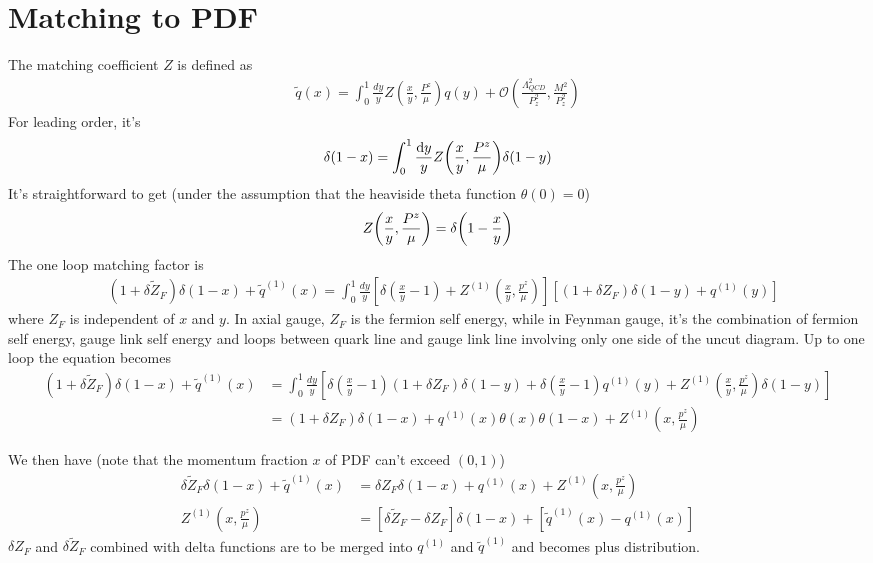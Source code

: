 \documentclass{article}
\begin{document}
\clearpage
\section{Matching to PDF}
The matching coefficient $Z$ is defined as
\begin{align}
	\tilde{q}(x)=\int_{0}^{1} \frac{d y}{y} Z\left(\frac{x}{y}, \frac{P^{z}}{\mu}\right) q(y)+\mathcal{O}\left(\frac{\Lambda_{Q C D}^{2}}{P_{z}^{2}}, \frac{M^{2}}{P_{z}^{2}}\right)
\end{align}
For leading order, it's
\begin{align}
	\delta(1-x)=\int_0^1\frac{\dd y}{y}Z\pqty{\frac{x}{y},\frac{P^z}{\mu}}\delta(1-y)
\end{align}
It's straightforward to get (under the assumption that the heaviside theta function $\theta(0)=0$)
\begin{align}
	Z\pqty{\frac{x}{y},\frac{P^z}{\mu}}=\delta\pqty{1-\frac{x}{y}}
\end{align}
The one loop matching factor is
\begin{align}
	  & \left(1+\delta \tilde{Z}_{F}\right) \delta(1-x)+\tilde{q}^{(1)}(x)
	= \int_{0}^{1} \frac{d y}{y}\left[\delta\left(\frac{x}{y}-1\right)+Z^{(1)}\left(\frac{x}{y}, \frac{p^{z}}{\mu}\right)\right]\left[\left(1+\delta Z_{F}\right) \delta(1-y)+q^{(1)}(y)\right]
\end{align}
where $Z_F$ is independent of $x$ and $y$. In axial gauge, $Z_F$ is the fermion self energy, while in Feynman gauge, it's the combination of fermion self energy, gauge link self energy and loops between quark line and gauge link line involving only one side of the uncut diagram. Up to one loop the equation becomes
\begin{align*}
	\left(1+\delta \tilde{Z}_{F}\right) \delta(1-x)+\tilde{q}^{(1)}(x)
	  & = \int_{0}^{1} \frac{d y}{y}\left[\delta\left(\frac{x}{y}-1\right)\left(1+\delta Z_{F}\right) \delta(1-y)+\delta\left(\frac{x}{y}-1\right)q^{(1)}(y)+Z^{(1)}\left(\frac{x}{y}, \frac{p^{z}}{\mu}\right) \delta(1-y)\right] \\
	  & = \left(1+\delta Z_{F}\right) \delta(1-x)+q^{(1)}(x)\theta(x)\theta(1-x)+Z^{(1)}\left(x, \frac{p^{z}}{\mu}\right)
\end{align*}

We then have (note that the momentum fraction $x$ of PDF can't exceed $(0,1)$)
\begin{align}
	\delta \tilde{Z}_{F} \delta(1-x)+\tilde{q}^{(1)}(x) & = \delta Z_{F}\delta(1-x)+q^{(1)}(x)+Z^{(1)}\left(x, \frac{p^{z}}{\mu}\right)                          \\
	Z^{(1)}\left(x, \frac{p^{z}}{\mu}\right)            & =\left[\delta \tilde{Z}_{F}-\delta Z_{F}\right] \delta(1-x)+\left[\tilde{q}^{(1)}(x)-q^{(1)}(x)\right]
\end{align}
$\delta Z_F$ and $\delta \tilde Z_F$ combined with delta functions are to be merged into $q^{(1)}$ and $\tilde q^{(1)}$ and becomes plus distribution.
\end{document}
